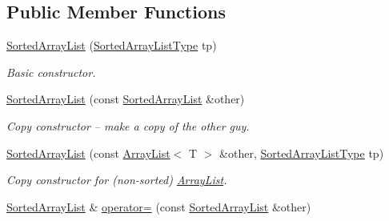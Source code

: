 \subsection*{Public Member Functions}
\begin{DoxyCompactItemize}
\item 
\mbox{\label{classssuds_1_1_sorted_array_list_ae0dc9b51d8787793124fd91b603c5518}} 
\mbox{\hyperlink{classssuds_1_1_sorted_array_list_ae0dc9b51d8787793124fd91b603c5518}{Sorted\+Array\+List}} (\mbox{\hyperlink{namespacessuds_a21d5ba2a8737547c6ec7c450072498e1}{Sorted\+Array\+List\+Type}} tp)
\begin{DoxyCompactList}\small\item\em Basic constructor. \end{DoxyCompactList}\item 
\mbox{\label{classssuds_1_1_sorted_array_list_a7adca3d62191f34a550fc3f650bf00ef}} 
\mbox{\hyperlink{classssuds_1_1_sorted_array_list_a7adca3d62191f34a550fc3f650bf00ef}{Sorted\+Array\+List}} (const \mbox{\hyperlink{classssuds_1_1_sorted_array_list}{Sorted\+Array\+List}} \&other)
\begin{DoxyCompactList}\small\item\em Copy constructor -- make a copy of the other guy. \end{DoxyCompactList}\item 
\mbox{\label{classssuds_1_1_sorted_array_list_abc4236f4e1d5b012643b6f180950bd48}} 
\mbox{\hyperlink{classssuds_1_1_sorted_array_list_abc4236f4e1d5b012643b6f180950bd48}{Sorted\+Array\+List}} (const \mbox{\hyperlink{classssuds_1_1_array_list}{Array\+List}}$<$ T $>$ \&other, \mbox{\hyperlink{namespacessuds_a21d5ba2a8737547c6ec7c450072498e1}{Sorted\+Array\+List\+Type}} tp)
\begin{DoxyCompactList}\small\item\em Copy constructor for (non-\/sorted) \mbox{\hyperlink{classssuds_1_1_array_list}{Array\+List}}. \end{DoxyCompactList}\item 
\mbox{\hyperlink{classssuds_1_1_sorted_array_list}{Sorted\+Array\+List}} \& \mbox{\hyperlink{classssuds_1_1_sorted_array_list_abdc8e1844f87e66c76cd0c925f8a7ebd}{operator=}} (const \mbox{\hyperlink{classssuds_1_1_sorted_array_list}{Sorted\+Array\+List}} \&other)
\item 

\end{DoxyCompactItemize}
